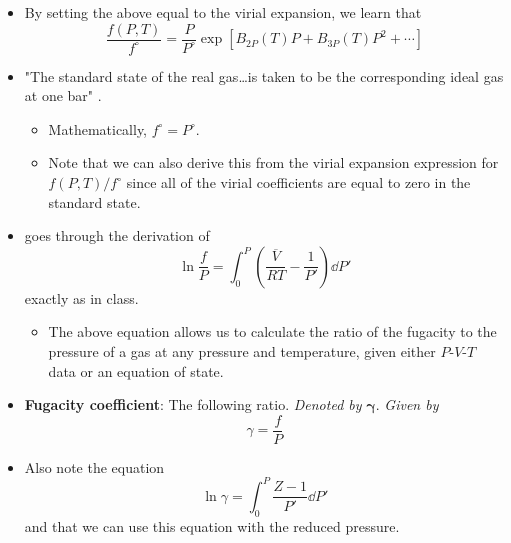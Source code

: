 \documentclass[../notes.tex]{subfiles}
\begin{document}
\begin{itemize}
    \item By setting the above equal to the virial expansion, we learn that
    \begin{equation*}
        \frac{f(P,T)}{f^\circ} = \frac{P}{P^\circ}\exp[B_{2P}(T)P+B_{3P}(T)P^2+\cdots]
    \end{equation*}
    \item "The standard state of the real gas\dots is taken to be the corresponding ideal gas at one bar" \parencite[906]{bib:McQuarrieSimon}.
    \begin{itemize}
        \item Mathematically, $f^\circ=P^\circ$.
        \item Note that we can also derive this from the virial expansion expression for $f(P,T)/f^\circ$ since all of the virial coefficients are equal to zero in the standard state.
    \end{itemize}
    \item \textcite{bib:McQuarrieSimon} goes through the derivation of
    \begin{equation*}
        \ln\frac{f}{P} = \int_0^P\left( \frac{\overline{V}}{RT}-\frac{1}{P'} \right)\dd{P'}
    \end{equation*}
    exactly as in class.
    \begin{itemize}
        \item The above equation allows us to calculate the ratio of the fugacity to the pressure of a gas at any pressure and temperature, given either $P$-$V$-$T$ data or an equation of state.
    \end{itemize}
    \item \textbf{Fugacity coefficient}: The following ratio. \emph{Denoted by} $\bm{\gamma}$. \emph{Given by}
    \begin{equation*}
        \gamma = \frac{f}{P}
    \end{equation*}
    \item Also note the equation
    \begin{equation*}
        \ln\gamma = \int_0^P\frac{Z-1}{P'}\dd{P'}
    \end{equation*}
    and that we can use this equation with the reduced pressure.
\end{itemize}
\end{document}
